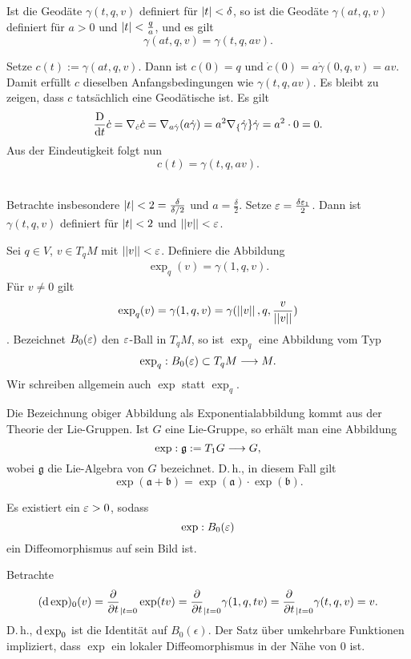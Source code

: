 Ist die Geodäte $\gamma(t,q, v)$ definiert für $\left|t\right| < \delta$, so ist die Geodäte $\gamma(at,q,v)$ definiert für $a > 0$ und $\left|t\right| < \frac{q}{a}$, und es gilt
\[ \gamma(at, q, v) = \gamma(t,q,av). \]
\begin{Beweis}{}
Setze $c(t) := \gamma(at, q,v)$. Dann ist $c(0) = q$ und $\dot{c}(0) = a \dot{\gamma}(0,q,v) = av$. Damit erfüllt $c$ dieselben Anfangsbedingungen wie $\gamma(t,q, av)$. Es bleibt zu zeigen, dass $c$ tatsächlich eine Geodätische ist. Es gilt
\[ \frac{\text{D}}{\text{d} t}\dot{c} = \nabla_{\dot{c}} \dot{c} = \nabla_{a\dot{\gamma}} (a\dot{\gamma}) = a^2 \nabla_\{\dot{\gamma}\} \dot{\gamma} = a^2 \cdot 0 = 0. \]
Aus der Eindeutigkeit folgt nun
\[ c(t) = \gamma(t,q,av). \]
\end{Beweis}\\
Betrachte insbesondere $\left|t\right| < 2 = \frac{\delta}{\delta / 2}$ und $a = \frac{\delta}{2}$. Setze $\varepsilon = \frac{\delta \varepsilon_1}{2}$. Dann ist $\gamma(t,q,v)$ definiert für $\left|t\right|<2$ und $\left|\left|v\right|\right| < \varepsilon$.

Sei $q \in V$, $v \in T_qM$ mit $\left|\left|v\right|\right| < \varepsilon$. Definiere die Abbildung
\begin{align*}
 \exp_q(v) = \gamma(1, q, v).
\end{align*}
Für $v \neq 0$ gilt
\[ \exp_q(v) = \gamma(1, q, v) = \gamma(\left|\left|v\right|\right|, q, \frac{v}{\left|\left|v\right|\right|}) \].
Bezeichnet $B_0(\varepsilon)$ den $\varepsilon$-Ball in $T_qM$, so ist $\exp_q$ eine Abbildung vom Typ
\[ \exp_q : B_0(\varepsilon) \subset T_qM \overset{}{\longrightarrow} M. \]
Wir schreiben allgemein auch $\exp$ statt $\exp_q$.

\Bem{}
Die Bezeichnung obiger Abbildung als Exponentialabbildung kommt aus der Theorie der Lie-Gruppen. Ist $G$ eine Lie-Gruppe, so erhält man eine Abbildung
\[ \exp : \mathfrak{g} := T_1G \overset{}{\longrightarrow} G, \]
wobei $\mathfrak{g}$ die Lie-Algebra von $G$ bezeichnet. D.\,h., in diesem Fall gilt
\[ \exp(\mathfrak{a} + \mathfrak{b}) = \exp(\mathfrak{a}) \cdot \exp(\mathfrak{b}). \]

\Prop{}
Es existiert ein $\varepsilon > 0$, sodass
\[ \exp : B_0(\varepsilon) \]
ein Diffeomorphismus auf sein Bild ist.
\begin{Beweis}{}
Betrachte
\[ (\text{d} \exp)_0(v) = \frac{\partial }{\partial t}_{| t = 0} \exp(tv) = \frac{\partial }{\partial t}_{| t = 0} \gamma(1, q, tv) =  \frac{\partial }{\partial t}_{| t = 0} \gamma(t, q, v) = v . \]
D.\,h., $\text{d} \exp_0$ ist die Identität auf $B_0(\epsilon)$. Der Satz über umkehrbare Funktionen impliziert, dass $\exp$ ein lokaler Diffeomorphismus in der Nähe von $0$ ist.
\end{Beweis}

